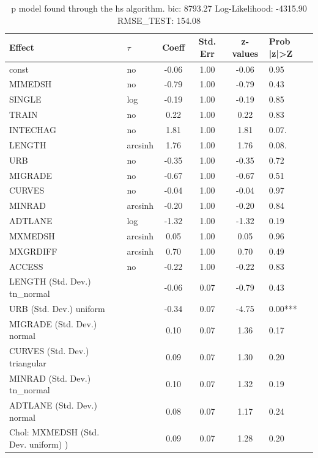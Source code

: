 \begin{table}
	\caption{p model found through the hs algorithm. bic: 8793.27 Log-Likelihood: -4315.90 RMSE_TEST: 154.08}
	\begin{center}
		\begin{tabular}{|l|l|c|c|c|l|}
			\hline
			Effect & $\tau$ & Coeff & Std. Err & z-values & Prob |z|>Z \\
			\hline
			const & no & -0.06 & 1.00 & -0.06 & 0.95 \\
			\hline
			MIMEDSH & no & -0.79 & 1.00 & -0.79 & 0.43 \\
			\hline
			SINGLE & log & -0.19 & 1.00 & -0.19 & 0.85 \\
			\hline
			TRAIN & no & 0.22 & 1.00 & 0.22 & 0.83 \\
			\hline
			INTECHAG & no & 1.81 & 1.00 & 1.81 & 0.07. \\
			\hline
			LENGTH & arcsinh & 1.76 & 1.00 & 1.76 & 0.08. \\
			\hline
			URB & no & -0.35 & 1.00 & -0.35 & 0.72 \\
			\hline
			MIGRADE & no & -0.67 & 1.00 & -0.67 & 0.51 \\
			\hline
			CURVES & no & -0.04 & 1.00 & -0.04 & 0.97 \\
			\hline
			MINRAD & arcsinh & -0.20 & 1.00 & -0.20 & 0.84 \\
			\hline
			ADTLANE & log & -1.32 & 1.00 & -1.32 & 0.19 \\
			\hline
			MXMEDSH & arcsinh & 0.05 & 1.00 & 0.05 & 0.96 \\
			\hline
			MXGRDIFF & arcsinh & 0.70 & 1.00 & 0.70 & 0.49 \\
			\hline
			ACCESS & no & -0.22 & 1.00 & -0.22 & 0.83 \\
			\hline
			LENGTH (Std. Dev.) tn_normal &  & -0.06 & 0.07 & -0.79 & 0.43 \\
			\hline
			URB (Std. Dev.) uniform &  & -0.34 & 0.07 & -4.75 & 0.00*** \\
			\hline
			MIGRADE (Std. Dev.) normal &  & 0.10 & 0.07 & 1.36 & 0.17 \\
			\hline
			CURVES (Std. Dev.) triangular &  & 0.09 & 0.07 & 1.30 & 0.20 \\
			\hline
			MINRAD (Std. Dev.) tn_normal &  & 0.10 & 0.07 & 1.32 & 0.19 \\
			\hline
			ADTLANE (Std. Dev.) normal &  & 0.08 & 0.07 & 1.17 & 0.24 \\
			\hline
			 Chol: MXMEDSH (Std. Dev. uniform) ) &  & 0.09 & 0.07 & 1.28 & 0.20 \\

\end{tabular}
\end{center}
\end{table}
